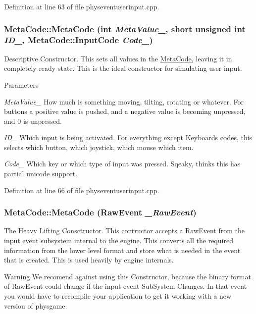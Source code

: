 Definition at line 63 of file physeventuserinput.cpp.\hypertarget{classMetaCode_a8f333b3a35badcda068fa44c7ee1f572}{
\subsubsection[{MetaCode}]{\setlength{\rightskip}{0pt plus 5cm}MetaCode::MetaCode (int {\em MetaValue\_\-}, \/  short unsigned int {\em ID\_\-}, \/  {\bf MetaCode::InputCode} {\em Code\_\-})}}
\label{d7/d72/classMetaCode_a8f333b3a35badcda068fa44c7ee1f572}


Descriptive Constructor. This sets all values in the \hyperlink{classMetaCode}{MetaCode}, leaving it in completely ready state. This is the ideal constructor for simulating user input. 
\begin{DoxyParams}{Parameters}
\item[{\em MetaValue\_\-}]How much is something moving, tilting, rotating or whatever. For buttons a positive value is pushed, and a negative value is becoming unpressed, and 0 is unpressed. \item[{\em ID\_\-}]Which input is being activated. For everything except Keyboards codes, this selects which button, which joystick, which mouse which item. \item[{\em Code\_\-}]Which key or which type of input was pressed. Sqeaky, thinks this has partial unicode support. \end{DoxyParams}


Definition at line 66 of file physeventuserinput.cpp.\hypertarget{classMetaCode_ad0a739796fa1de2991c196d8ee7b19b2}{
\subsubsection[{MetaCode}]{\setlength{\rightskip}{0pt plus 5cm}MetaCode::MetaCode (RawEvent {\em \_\-RawEvent})}}
\label{d7/d72/classMetaCode_ad0a739796fa1de2991c196d8ee7b19b2}


The Heavy Lifting Consctructor. This contructor accepts a RawEvent from the input event subsystem internal to the engine. This converts all the required information from the lower level format and store what is needed in the event that is created. This is used heavily by engine internals. \begin{DoxyWarning}{Warning}
We recomend against using this Constructor, because the binary format of RawEvent could change if the input event SubSystem Changes. In that event you would have to recompile your application to get it working with a new version of physgame. 
\end{DoxyWarning}



